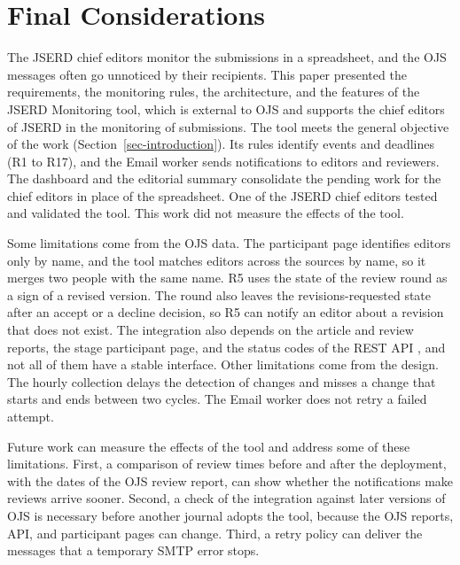 \documentclass[12pt]{article}
\begin{document}
\FloatBarrier
\section{Final Considerations}
\label{sec-final}

The JSERD chief editors monitor the submissions in a spreadsheet, and the
OJS messages often go unnoticed by their recipients. This paper presented
the requirements, the monitoring rules, the
architecture, and the features of the JSERD Monitoring tool, which is
external to OJS and supports the chief editors of JSERD in the monitoring of submissions.
The tool meets the general objective of the work
(Section~\ref{sec-introduction}). Its rules identify events and deadlines
(R1 to R17), and the Email worker sends notifications to editors and
reviewers. The dashboard and the editorial summary consolidate the pending
work for the chief editors in place of the spreadsheet. One of the JSERD chief editors tested and validated
the tool. This work did not measure the effects of the tool.

Some limitations come from the OJS data. The participant page identifies
editors only by name, and the tool matches editors across the sources by
name, so it merges two people with the same name. R5 uses the state of the
review round as a sign of a revised version. The round also leaves the
revisions-requested state after an accept or a decline decision, so R5 can
notify an editor about a revision that does not exist. The integration also
depends on the article and review reports, the stage participant page, and
the status codes of the REST API \cite{pkplib}, and not all of them have a
stable interface. Other
limitations come from the design. The hourly collection delays the detection
of changes and misses a change that starts and ends between two cycles. The
Email worker does not retry a failed attempt.

Future work can measure the effects of the tool and address some of these
limitations. First, a comparison of review times before and after the
deployment, with the dates of the OJS review report, can show whether the
notifications make reviews arrive sooner. Second, a check of the integration
against later versions of OJS is necessary before another journal adopts
the tool, because the OJS reports, API, and participant pages can change.
Third, a retry policy can deliver the messages that a
temporary SMTP error stops.



\end{document}
